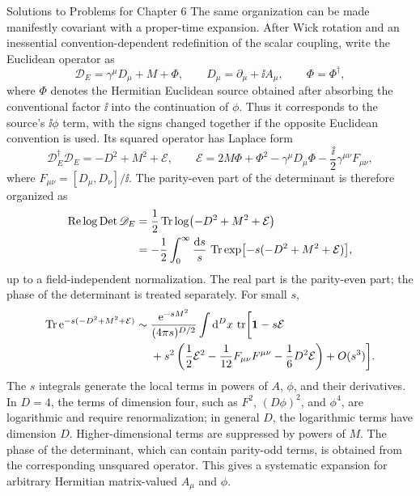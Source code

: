 \begin{bankssolutions}{Solutions to Problems for Chapter 6}
The same organization can be made manifestly covariant with a proper-time
expansion.  After Wick rotation and an inessential convention-dependent
redefinition of the scalar coupling, write the Euclidean operator as
\[
 \mathscr D_E=\gamma^\mu D_\mu+M+\Phi,
 \qquad D_\mu=\partial_\mu+\ii A_\mu,
 \qquad \Phi=\Phi^\dagger,
\]
where $\Phi$ denotes the Hermitian Euclidean source obtained after absorbing
the conventional factor $\ii$ into the continuation of $\phi$.  Thus it
corresponds to the source's $\ii\phi$ term, with the signs changed together
if the opposite Euclidean convention is used.  Its squared operator has Laplace form
\begin{equation*}
 \mathscr D_E^\dagger\mathscr D_E=-D^2+M^2+\mathcal E,
 \qquad
 \mathcal E=2M\Phi+\Phi^2-\gamma^\mu D_\mu\Phi
 -\frac{\ii}{2}\gamma^{\mu\nu}F_{\mu\nu},
\end{equation*}
where $F_{\mu\nu}=[D_\mu,D_\nu]/\ii$.  The parity-even part of the
determinant is therefore organized as
\begin{align*}
 \operatorname{Re}\log\operatorname{Det}\mathscr D_E
 & =\frac12\operatorname{Tr}\log\bigl(-D^2+M^2+\mathcal E\bigr)\\
 & =-\frac12\int_0^\infty\frac{\mathop{}\!\mathrm{d} s}{s}\,
 \operatorname{Tr}\exp\bigl[-s(-D^2+M^2+\mathcal E)\bigr],
\end{align*}
up to a field-independent normalization.  The real part is the
parity-even part; the phase of the determinant is treated separately.  For
small $s$,
\begin{align*}
 \operatorname{Tr}\mathrm{e}^{-s(-D^2+M^2+\mathcal E)}
 \sim{}&\frac{\mathrm{e}^{-sM^2}}{(4\pi s)^{D/2}}\int\mathop{}\!\mathrm{d}^D x\,\operatorname{tr}\biggl[\mathbf1-s\mathcal E\\
 &+s^2\left(\frac12\mathcal E^2-\frac1{12}F_{\mu\nu}F^{\mu\nu}
 -\frac16D^2\mathcal E\right)+O(s^3)\biggr].
\end{align*}
The $s$ integrals generate the local terms in powers of $A$, $\phi$, and
their derivatives.  In \(D=4\), the terms of dimension four, such as \(F^2\),
\((D\phi)^2\), and \(\phi^4\), are logarithmic and require renormalization;
in general \(D\), the logarithmic terms have dimension \(D\).  Higher-dimensional
terms are suppressed by powers of \(M\).  The phase of the
determinant, which can contain parity-odd terms, is obtained from the
corresponding unsquared operator.  This gives a systematic expansion for
arbitrary Hermitian matrix-valued $A_\mu$ and $\phi$.


\end{bankssolutions}
